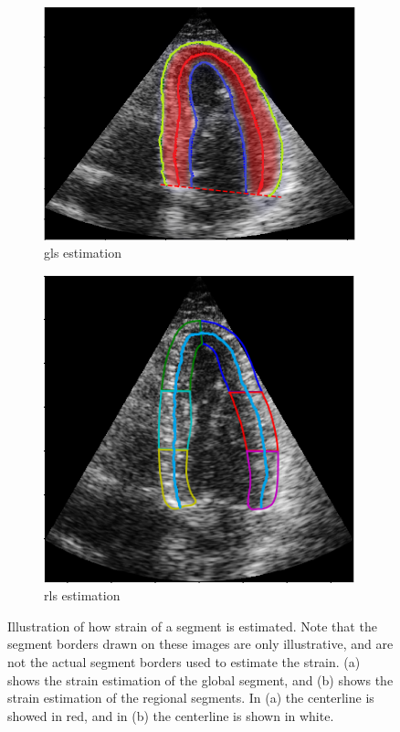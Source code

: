 \begin{figure}[H]
    \centering
    \begin{subfigure}[b]{0.49\textwidth} 
        \includegraphics[width=0.99\textwidth]{echocardiography/gls_estimation.png}
        \caption{\acrshort{gls} estimation}
        \label{fig:gls_estimation}
    \end{subfigure}
    \begin{subfigure}[b]{0.49\textwidth}
        \includegraphics[width=0.99\textwidth]{echocardiography/rls_estimation.png}
        \caption{\acrshort{rls} estimation}
        \label{fig:rls_estimation}
    \end{subfigure}
    \caption{Illustration of how strain of a segment is estimated. Note that the segment borders drawn on these images are only illustrative, and are not the actual segment borders used to estimate the strain. (a) shows the strain estimation of the global segment, and (b) shows the strain estimation of the regional segments. In (a) the centerline is showed in red, and in (b) the centerline is shown in white.}
    \label{fig:strain_estimation}
\end{figure}

